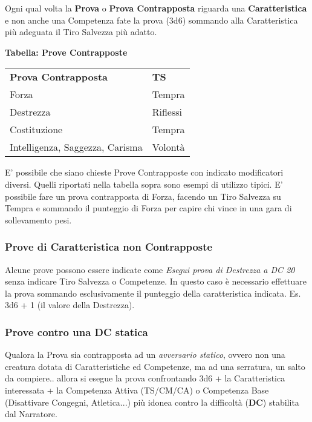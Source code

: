 \begin{multicols}{2}
Ogni qual volta la \textbf{Prova} o \textbf{Prova Contrapposta} riguarda una \textbf{Caratteristica} e non anche una Competenza fate la prova (3d6) sommando alla Caratteristica più adeguata il Tiro Salvezza più adatto.

\smallskip

\textbf{Tabella: Prove Contrapposte}\label{Tabella Prove Contrapposte e Caratteristiche}

\smallskip

\noindent\begin{tabularx}{0.45\textwidth}{Xl}
\toprule
\textbf{Prova Contrapposta}& \textbf{TS} \\
Forza& Tempra \\
Destrezza&Riflessi\\
Costituzione& Tempra\\
Intelligenza, Saggezza, Carisma& Volontà
\end{tabularx}

\smallskip

E' possibile che siano chieste Prove Contrapposte con indicato modificatori diversi. Quelli riportati nella tabella sopra sono esempi di utilizzo tipici. E' possibile fare un prova contrapposta di Forza, facendo un Tiro Salvezza su Tempra e sommando il punteggio di Forza per capire chi vince in una gara di sollevamento pesi.

\subsubsection{Prove di Caratteristica non Contrapposte}

Alcune prove possono essere indicate come \emph{Esegui prova di Destrezza a DC 20} senza indicare Tiro Salvezza o Competenze. In questo caso è necessario effettuare la prova sommando esclusivamente il punteggio della caratteristica indicata. Es. 3d6 + 1 (il valore della Destrezza).

\subsubsection{Prove contro una DC statica}

Qualora la Prova sia contrapposta ad un \textit{avversario statico}, ovvero non una creatura dotata di Caratteristiche ed Competenze, ma ad una serratura, un salto da compiere.. allora si esegue la prova confrontando 3d6 + la Caratteristica interessata + la Competenza Attiva (TS/CM/CA) o Competenza Base (Disattivare Congegni, Atletica...) più idonea contro la difficoltà (\textbf{DC}) stabilita dal Narratore.


\end{multicols}

